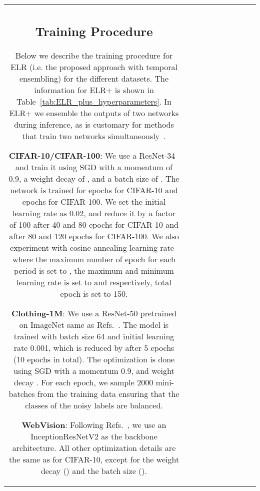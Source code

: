 \documentclass{article}
\newcommand{\1}{\mathds{1}}
\begin{document}
\begin{table}
\begin{center}
\begin{threeparttable}
{\begin{tabular}{c|c|cccc|cccc}
{{\subsection{Training Procedure}
Below we describe the training procedure for ELR (i.e. the proposed approach with temporal ensembling) for the different datasets. The information for ELR+ is shown in Table~\ref{tab:ELR_plus_hyperparameters}. In ELR+ we ensemble the outputs of two networks during inference, as is customary for  methods that train two networks simultaneously~\cite{li2020dividemix,Han2018CoteachingRT}.

\textbf{CIFAR-10/CIFAR-100}: We use a ResNet-34~\cite{he2016deep} and train it using SGD with a momentum of 0.9, a weight decay of , and a batch size of . The network is trained for  epochs for CIFAR-10 and  epochs for CIFAR-100. We set the initial learning rate as 0.02, and reduce it by a factor of 100 after 40 and 80 epochs for CIFAR-10 and after 80 and 120 epochs for CIFAR-100. We also experiment with cosine annealing learning rate~\cite{Loshchilov2017SGDRSG} where the maximum number of epoch for each period is set to , the maximum and minimum learning rate is set to  and  respectively, total epoch is set to 150. 

\textbf{Clothing-1M}: We use a ResNet-50 pretrained on ImageNet same as Refs.~\cite{Wang2019SymmetricCE,xiao2015learning}. The model is trained with batch size 64 and initial learning rate 0.001, which is reduced by  after 5 epochs (10 epochs in total). The optimization is done using SGD with a momentum 0.9, and weight decay . For each epoch, we sample 2000 mini-batches from the training data ensuring that the classes of the noisy labels are balanced. 


\textbf{WebVision}: Following Refs.~\cite{Jiang2018MentorNetLD, li2020dividemix}, we use an InceptionResNetV2 as the backbone architecture. All other optimization details are the same as for CIFAR-10, except for the weight decay () and the batch size ().





}}
\end{tabular}}
\end{threeparttable}
\end{center}
\end{table}
\end{document}
